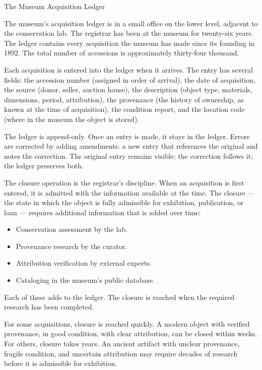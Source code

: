 \begin{coda}{The Museum Acquisition Ledger}

The museum's acquisition ledger is in a small office on the lower
level, adjacent to the conservation lab. The registrar has been at
the museum for twenty-six years. The ledger contains every
acquisition the museum has made since its founding in 1892. The
total number of accessions is approximately thirty-four thousand.

Each acquisition is entered into the ledger when it arrives. The
entry has several fields: the accession number (assigned in order
of arrival), the date of acquisition, the source (donor, seller,
auction house), the description (object type, materials, dimensions,
period, attribution), the provenance (the history of ownership, as
known at the time of acquisition), the condition report, and the
location code (where in the museum the object is stored).

The ledger is append-only. Once an entry is made, it stays in the
ledger. Errors are corrected by adding amendments: a new entry that
references the original and notes the correction. The original
entry remains visible; the correction follows it; the ledger
preserves both.

The closure operation is the registrar's discipline. When an
acquisition is first entered, it is admitted with the information
available at the time. The closure --- the state in which the object
is fully admissible for exhibition, publication, or loan ---
requires additional information that is added over time:
\begin{itemize}
\item Conservation assessment by the lab.
\item Provenance research by the curator.
\item Attribution verification by external experts.
\item Cataloging in the museum's public database.
\end{itemize}
Each of these adds to the ledger. The closure is reached when the
required research has been completed.

For some acquisitions, closure is reached quickly. A modern object
with verified provenance, in good condition, with clear
attribution, can be closed within weeks. For others, closure takes
years. An ancient artifact with unclear provenance, fragile
condition, and uncertain attribution may require decades of
research before it is admissible for exhibition.


\end{coda}
